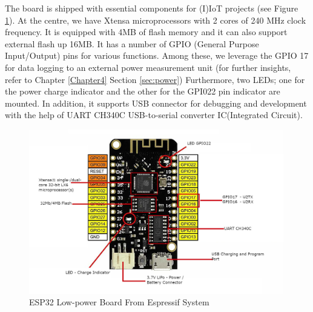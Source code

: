 The board is shipped with essential components for (I)IoT projects (see Figure \ref{fig:esp32}). At the centre, we have Xtensa microprocessors with 2 cores of 240 MHz clock frequency. It is equipped with 4MB of flash memory and it can also support external flash up 16MB. It has a number of GPIO (General Purpose Input/Output) pins for various functions. Among these, we leverage the GPIO 17 for data logging to an external power measurement unit (for further insights, refer to  Chapter \ref{Chapter4} Section \ref{sec:power})
Furthermore, two LEDs; one for the power charge indicator and the other for the GPI022 pin indicator are mounted. In addition, it supports USB connector for debugging and development with the help of UART CH340C USB-to-serial converter IC(Integrated Circuit).
\begin{figure}[H]    
{
    \centering
    \includegraphics[width=0.99\textwidth]{images/fp/esp32final_edited.jpg}
    \caption{ESP32 Low-power Board From Espressif System}
    \label{fig:esp32}
}
\end{figure}


